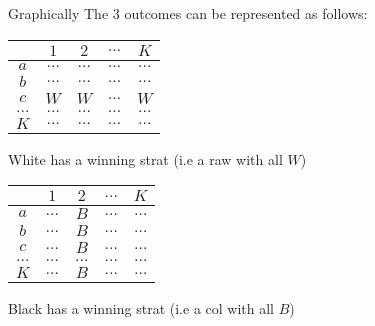 \documentclass[../main.tex]{subfiles}
\begin{document}
Graphically The 3 outcomes can be represented as follows:
\vspace{0.5cm}
\begin{center}
    \begin{minipage}{0.3\textwidth}
        \centering
        \begin{tabular}{|c|c|c|c|c|}
            \hline
                     & $1$      & $2$      & $\ldots$ & $K$      \\\hline
            $a$      & $\ldots$ & $\ldots$ & $\ldots$ & $\ldots$ \\\hline
            $b$      & $\ldots$ & $\ldots$ & $\ldots$ & $\ldots$ \\\hline
            $c$      & $W $     & $W$      & $\ldots$ & $W$      \\\hline
            $\ldots$ & $\ldots$ & $\ldots$ & $\ldots$ & $\ldots$ \\\hline
            $K$      & $\ldots$ & $\ldots$ & $\ldots$ & $\ldots$ \\
            \hline
        \end{tabular}
        \vspace{0.5cm}
        \par{White has a winning strat (i.e a raw with all $W$)}
    \end{minipage}
    \hfill
    \begin{minipage}{0.3\textwidth}
        \centering
        \begin{tabular}{|c|c|c|c|c|}
            \hline
                     & $1$      & $2$      & $\ldots$ & $K$      \\\hline
            $a$      & $\ldots$ & $B$      & $\ldots$ & $\ldots$ \\\hline
            $b$      & $\ldots$ & $B$      & $\ldots$ & $\ldots$ \\\hline
            $c$      & $\ldots$ & $B$      & $\ldots$ & $\ldots$ \\\hline
            $\ldots$ & $\ldots$ & $\ldots$ & $\ldots$ & $\ldots$ \\\hline
            $K$      & $\ldots$ & $B$      & $\ldots$ & $\ldots$ \\
            \hline
        \end{tabular}
        \vspace{0.5cm}
        \par{Black has a winning strat (i.e a col with all $B$)}
    \end{minipage}
    \hfill
    \begin{minipage}{0.3\textwidth}

\end{minipage}
\end{center}
\end{document}
